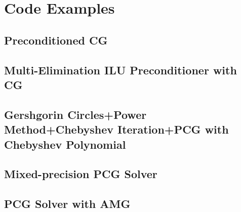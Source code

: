 \chapter{Code Examples}

\section{Preconditioned CG}




\newpage
\section{Multi-Elimination ILU Preconditioner with CG}




\newpage
\section{Gershgorin Circles+Power Method+Chebyshev Iteration+PCG with Chebyshev Polynomial}





\newpage
\section{Mixed-precision PCG Solver}




\newpage
\section{PCG Solver with AMG}

